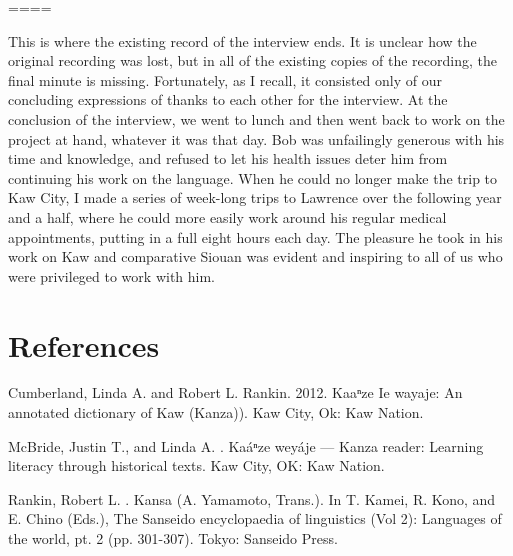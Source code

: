 \documentclass[output=paper]{LSP/langsci}
\begin{document}
====

\noindent This is where the existing record of the interview ends. It is unclear how the original recording was lost, but in all of the existing copies of the recording, the final minute is missing. Fortunately, as I recall, it consisted only of our concluding expressions of thanks to each other for the interview. At the conclusion of the interview, we went to lunch and then went back to work on the project at hand, whatever it was that day. Bob was unfailingly generous with his time and knowledge, and refused to let his health issues deter him from continuing his work on the language. When he could no longer make the trip to Kaw City, I made a series of week-long trips to Lawrence over the following year and a half, where he could more easily work around his regular medical appointments, putting in a full eight hours each day. The pleasure he took in his work on Kaw and comparative Siouan was evident and inspiring to all of us who were privileged to work with him. 

\section*{References}

\printbibliography 

\begin{reflist}

Cumberland, Linda A. and Robert L. Rankin. 2012. Kaaⁿze Ie wayaje: An annotated dictionary of Kaw (Kanza)). Kaw City, Ok: Kaw Nation.

McBride, Justin T., and Linda A. \citet{Cumberland2010}. Ka\'aⁿze wey\'aje --- Kanza reader: Learning literacy through historical texts. Kaw City, OK: Kaw Nation.

Rankin, Robert L. . Kansa (A. Yamamoto, Trans.). In T. Kamei, R. Kono, and E. Chino (Eds.), The Sanseido encyclopaedia of linguistics (Vol 2): Languages of the world, pt. 2 (pp. 301-307). Tokyo: Sanseido Press.
\end{reflist}
\end{document}
